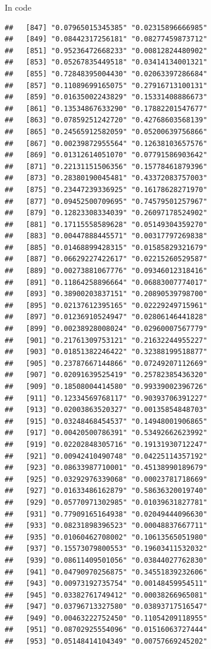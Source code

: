 \documentclass[ignorenonframetext,]{beamer}
\begin{document}
\begin{frame}[fragile]{In code}
\begin{verbatim}
##   [847] "0.07965015345385" "0.02315896666985"
##   [849] "0.08442317256181" "0.08277459873712"
##   [851] "0.95236472668233" "0.00812824480902"
##   [853] "0.05267835449518" "0.03414134001321"
##   [855] "0.72848395004430" "0.02063397286684"
##   [857] "0.11089699165075" "0.27916713100131"
##   [859] "0.01635002243829" "0.15331408886673"
##   [861] "0.13534867633290" "0.17882201547677"
##   [863] "0.07859251242720" "0.42768603568139"
##   [865] "0.24565912582059" "0.05200639756866"
##   [867] "0.00239872955564" "0.12638103657576"
##   [869] "0.01312614051070" "0.07791586903642"
##   [871] "0.22131151506356" "0.15778461879396"
##   [873] "0.28380190045481" "0.43372083757003"
##   [875] "0.23447239336925" "0.16178628271970"
##   [877] "0.09452500709695" "0.74579501257967"
##   [879] "0.12823308334039" "0.26097178524902"
##   [881] "0.17115558589628" "0.05149304359270"
##   [883] "0.00447888445571" "0.00317797269838"
##   [885] "0.01468899428315" "0.01585829321679"
##   [887] "0.06629227422617" "0.02215260529587"
##   [889] "0.00273881067776" "0.09346012318416"
##   [891] "0.11864258896664" "0.06883007774017"
##   [893] "0.38900203837151" "0.20890539798700"
##   [895] "0.02137612395165" "0.02229249715961"
##   [897] "0.01236910524947" "0.02806146441828"
##   [899] "0.00238928008024" "0.02960007567779"
##   [901] "0.21761309753121" "0.21632244955227"
##   [903] "0.01851382246422" "0.32388199518877"
##   [905] "0.23787667144866" "0.07249207112669"
##   [907] "0.02091639525419" "0.25782385436320"
##   [909] "0.18508004414580" "0.99339002396726"
##   [911] "0.12334569768117" "0.90393706391227"
##   [913] "0.02003863520327" "0.00135854848703"
##   [915] "0.03248468454537" "0.14948001906865"
##   [917] "0.00420500786391" "0.53492662623992"
##   [919] "0.02202848305716" "0.19131930712247"
##   [921] "0.00942410490748" "0.04225114357192"
##   [923] "0.08633987710001" "0.45138990189679"
##   [925] "0.03292976339068" "0.00023781718669"
##   [927] "0.01633486162879" "0.58636320019740"
##   [929] "0.05770971302985" "0.01039631827781"
##   [931] "0.77909165164938" "0.02049444096630"
##   [933] "0.08231898396523" "0.00048837667711"
##   [935] "0.01060462708002" "0.10613565051980"
##   [937] "0.15573079800553" "0.19603411532032"
##   [939] "0.08611409501056" "0.03844027762830"
##   [941] "0.04790970256875" "0.34551839232606"
##   [943] "0.00973192735754" "0.00148459954511"
##   [945] "0.03382761749412" "0.00038266965081"
##   [947] "0.03796713327580" "0.03893717516547"
##   [949] "0.00463222752450" "0.11054209118955"
##   [951] "0.08702925554096" "0.01516063727444"
##   [953] "0.05148414104349" "0.00757669245202"

\end{verbatim}
\end{frame}
\end{document}
